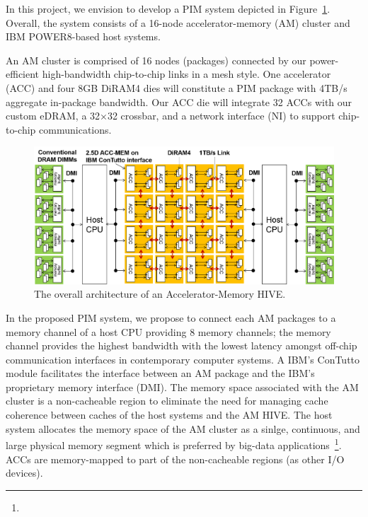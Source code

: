 \noindent 
In this project, we envision to develop a PIM system depicted in Figure~\ref{fig:arch}. 
Overall, the system consists of a 16-node accelerator-memory (AM) cluster and IBM POWER8-based host systems.
 
An AM cluster is comprised of 16 nodes (packages) connected by our power-efficient high-bandwidth chip-to-chip links in a mesh style. 
One accelerator (ACC) and four 8GB DiRAM4 dies will constitute a PIM package with 4TB/s aggregate in-package bandwidth. 
Our ACC die will integrate 32 ACCs with our custom eDRAM, a 32×32 crossbar, and a network interface (NI) to support chip-to-chip communications.

\begin{figure}
\center
\includegraphics[width=1.0\linewidth]{./fig/arch.png}
\caption{The overall architecture of an Accelerator-Memory HIVE.}
\label{fig:arch}
\end{figure}

In the proposed PIM system, we propose to connect each AM packages to a memory channel of a host CPU providing 8 memory channels;
the memory channel provides the highest bandwidth with the lowest latency amongst off-chip communication interfaces in contemporary computer systems.
A IBM's ConTutto module facilitates the interface between an AM package and the IBM's proprietary memory interface (DMI).
The memory space associated with the AM cluster is a non-cacheable region to eliminate the need for managing cache coherence between caches of the host systems and the AM HIVE.
The host system allocates the memory space of the AM cluster as a sinlge, continuous, and large physical memory segment which is preferred by big-data applications~\footnote{}.
ACCs are memory-mapped to part of the non-cacheable regions (as other I/O devices).


